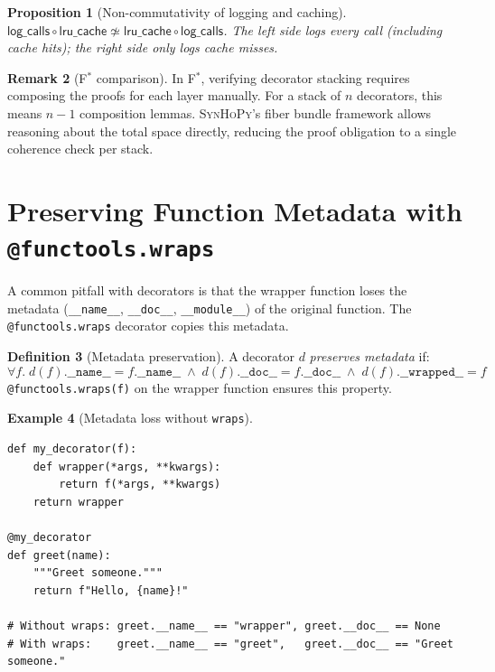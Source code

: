 \documentclass[11pt,a4paper]{report}
\theoremstyle{definition}
\newtheorem{definition}{Definition}[chapter]
\newtheorem{example}[definition]{Example}
\newtheorem{remark}[definition]{Remark}
\theoremstyle{plain}
\newtheorem{proposition}[definition]{Proposition}
\newcommand{\fstar}{F$^{*}$}
\newcommand{\synhopy}{\textsc{SynHoPy}}
\begin{document}
\begin{proposition}[Non-commutativity of logging and caching]
\label{prop:log-cache-noncommute}
$\mathsf{log\_calls} \circ \mathsf{lru\_cache} \not\simeq
 \mathsf{lru\_cache} \circ \mathsf{log\_calls}$.
The left side logs every call (including cache hits); the right side only logs
cache misses.
\end{proposition}

\begin{remark}[\fstar{} comparison]
In \fstar{}, verifying decorator stacking requires composing the proofs for each
layer manually. For a stack of $n$ decorators, this means $n-1$ composition
lemmas. \synhopy{}'s fiber bundle framework allows reasoning about the total
space directly, reducing the proof obligation to a single coherence check per
stack.
\end{remark}


\section{Preserving Function Metadata with \texttt{@functools.wraps}}
\label{sec:functools-wraps}

A common pitfall with decorators is that the wrapper function loses the
metadata (\texttt{\_\_name\_\_}, \texttt{\_\_doc\_\_}, \texttt{\_\_module\_\_})
of the original function. The \texttt{@functools.wraps} decorator copies
this metadata.

\begin{definition}[Metadata preservation]
A decorator $d$ \emph{preserves metadata} if:
\[
  \forall f.\;
  d(f).\mathtt{\_\_name\_\_} = f.\mathtt{\_\_name\_\_} \;\wedge\;
  d(f).\mathtt{\_\_doc\_\_} = f.\mathtt{\_\_doc\_\_} \;\wedge\;
  d(f).\mathtt{\_\_wrapped\_\_} = f
\]
\texttt{@functools.wraps(f)} on the wrapper function ensures this property.
\end{definition}

\begin{example}[Metadata loss without \texttt{wraps}]
\begin{lstlisting}[style=python]
def my_decorator(f):
    def wrapper(*args, **kwargs):
        return f(*args, **kwargs)
    return wrapper

@my_decorator
def greet(name):
    """Greet someone."""
    return f"Hello, {name}!"

# Without wraps: greet.__name__ == "wrapper", greet.__doc__ == None
# With wraps:    greet.__name__ == "greet",   greet.__doc__ == "Greet someone."
\end{lstlisting}
\end{example}
\end{document}
